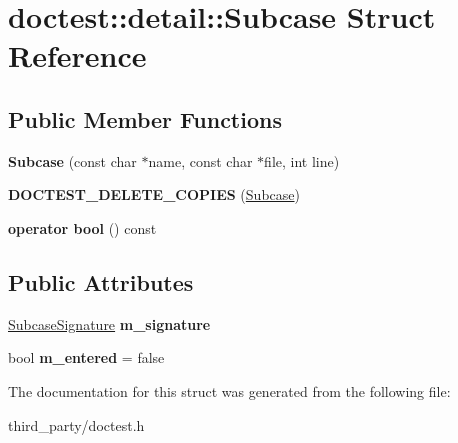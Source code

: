 \hypertarget{structdoctest_1_1detail_1_1_subcase}{}\section{doctest\+::detail\+::Subcase Struct Reference}
\label{structdoctest_1_1detail_1_1_subcase}
\subsection*{Public Member Functions}
\begin{DoxyCompactItemize}
\item 
\mbox{\label{structdoctest_1_1detail_1_1_subcase_a1a2b0136a3799e2344709840260a3277}} 
{\bfseries Subcase} (const char $\ast$name, const char $\ast$file, int line)
\item 
\mbox{\label{structdoctest_1_1detail_1_1_subcase_a1ad9897c4440fda2d6d64fe7e197563d}} 
{\bfseries D\+O\+C\+T\+E\+S\+T\+\_\+\+D\+E\+L\+E\+T\+E\+\_\+\+C\+O\+P\+I\+ES} (\mbox{\hyperlink{structdoctest_1_1detail_1_1_subcase}{Subcase}})
\item 
\mbox{\label{structdoctest_1_1detail_1_1_subcase_a91a520769fc55fb5be781f949ef3200f}} 
{\bfseries operator bool} () const
\end{DoxyCompactItemize}
\subsection*{Public Attributes}
\begin{DoxyCompactItemize}
\item 
\mbox{\label{structdoctest_1_1detail_1_1_subcase_a54730e9b88cf33ea4a5c873164029202}} 
\mbox{\hyperlink{structdoctest_1_1_subcase_signature}{Subcase\+Signature}} {\bfseries m\+\_\+signature}
\item 
\mbox{\label{structdoctest_1_1detail_1_1_subcase_acb703ee6e769f56fba4053447c1a36e4}} 
bool {\bfseries m\+\_\+entered} = false
\end{DoxyCompactItemize}


The documentation for this struct was generated from the following file\+:\begin{DoxyCompactItemize}
\item 
third\+\_\+party/doctest.\+h\end{DoxyCompactItemize}
